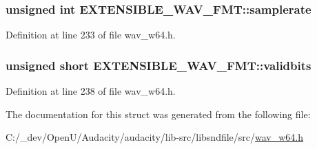\subsubsection[{\texorpdfstring{samplerate}{samplerate}}]{\setlength{\rightskip}{0pt plus 5cm}unsigned {\bf int} E\+X\+T\+E\+N\+S\+I\+B\+L\+E\+\_\+\+W\+A\+V\+\_\+\+F\+M\+T\+::samplerate}\hypertarget{struct_e_x_t_e_n_s_i_b_l_e___w_a_v___f_m_t_a66c0d79a22c39f7ff8331402554b1eba}{}\label{struct_e_x_t_e_n_s_i_b_l_e___w_a_v___f_m_t_a66c0d79a22c39f7ff8331402554b1eba}


Definition at line 233 of file wav\+\_\+w64.\+h.

\subsubsection[{\texorpdfstring{validbits}{validbits}}]{\setlength{\rightskip}{0pt plus 5cm}unsigned short E\+X\+T\+E\+N\+S\+I\+B\+L\+E\+\_\+\+W\+A\+V\+\_\+\+F\+M\+T\+::validbits}\hypertarget{struct_e_x_t_e_n_s_i_b_l_e___w_a_v___f_m_t_a43ef1f89bcc07fad28ee76c61e49b795}{}\label{struct_e_x_t_e_n_s_i_b_l_e___w_a_v___f_m_t_a43ef1f89bcc07fad28ee76c61e49b795}


Definition at line 238 of file wav\+\_\+w64.\+h.



The documentation for this struct was generated from the following file\+:\begin{DoxyCompactItemize}
\item 
C\+:/\+\_\+dev/\+Open\+U/\+Audacity/audacity/lib-\/src/libsndfile/src/\hyperlink{wav__w64_8h}{wav\+\_\+w64.\+h}\end{DoxyCompactItemize}
